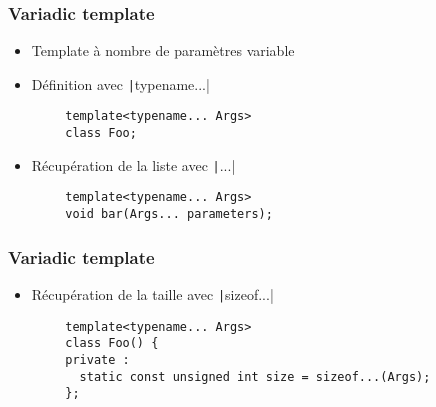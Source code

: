 \documentclass[C++.tex]{subfiles}
\begin{document}
\begin{frame}[fragile]
	\frametitle{Variadic template}
	\begin{itemize}
		\item Template à nombre de paramètres variable
		\item Définition avec \texttt|typename...|
	\end{itemize}

	\begin{verbatim}
		template<typename... Args>
		class Foo;
	\end{verbatim}

	\begin{itemize}
		\item Récupération de la liste avec \texttt|...|
	\end{itemize}

	\begin{verbatim}
		template<typename... Args>
		void bar(Args... parameters);
	\end{verbatim}

\end{frame}

\begin{frame}[fragile]
	\frametitle{Variadic template}
	\begin{itemize}
		\item Récupération de la taille avec \texttt|sizeof...|
	\end{itemize}

	\begin{verbatim}
		template<typename... Args>
		class Foo() {
		private :
		  static const unsigned int size = sizeof...(Args);
		};
	\end{verbatim}
\end{frame}
\end{document}
